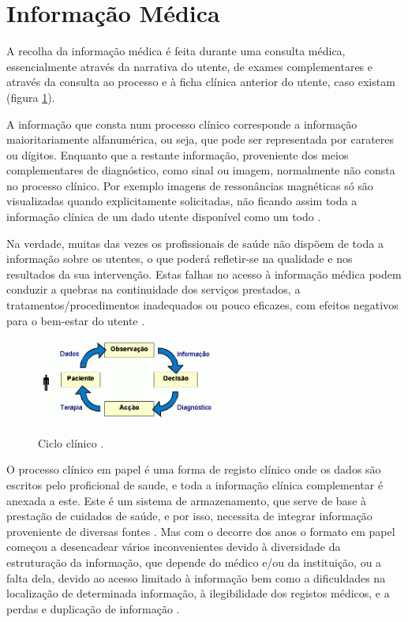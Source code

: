 \documentclass[conference]{IEEEtran}
\begin{document}

\section{Informação Médica}	\label{infmed}

A recolha da informação médica é feita durante uma consulta médica, essencialmente através da narrativa do utente, de exames complementares e através da consulta ao processo e à ficha clínica anterior do utente, caso existam (figura \ref{fig1}).

A informação que consta num processo clínico corresponde a informação maioritariamente alfanumérica, ou seja, que pode ser representada por carateres ou dígitos. Enquanto que a restante informação, proveniente dos meios complementares de diagnóstico, como sinal ou imagem, normalmente não consta no processo clínico. Por exemplo imagens de ressonâncias magnéticas só são visualizadas quando explicitamente solicitadas, não ficando assim toda a informação clínica de um dado utente disponível como um todo \cite{santos2010comunicaccao}.

Na verdade, muitas das vezes os profissionais de saúde não dispõem de toda a informação sobre os utentes, o que poderá refletir-se na qualidade e nos resultados da sua intervenção. Estas falhas no acesso à informação médica podem conduzir a quebras na continuidade dos serviços prestados, a tratamentos/procedimentos inadequados ou pouco eficazes, com efeitos negativos para o bem-estar do utente \cite{santos2010comunicaccao}. 

\begin{figure}[!t]	
    \centering
    \begin{minipage}{.9\textwidth}
        \includegraphics[width=0.53\textwidth]{diagnostico_terapeutica.png}
        \label{fig1}
    \end{minipage}%
    \caption{Ciclo clínico \cite{regclinelect}.}
\end{figure}
 
O processo clínico em papel é uma forma de registo clínico onde os dados são escritos pelo proficional de saude, e toda a informação clínica complementar é anexada a este. Este é um sistema de armazenamento, que serve de base à prestação de cuidados de saúde, e por isso, necessita de integrar informação proveniente de diversas fontes \cite{regclinelect}. Mas com o decorre dos anos o formato em papel começou a desencadear vários inconvenientes devido à diversidade da estruturação da informação, que depende do médico e/ou da instituição, ou a falta dela, devido ao acesso limitado à informação bem como a dificuldades na localização de determinada informação, à ilegibilidade dos registos médicos, e a perdas e duplicação de informação \cite{regclinelect}.
\end{document}
